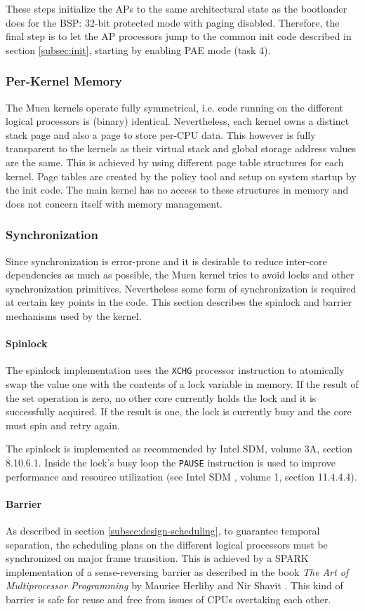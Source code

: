 These steps initialize the APs to the same architectural state as the
bootloader does for the BSP: 32-bit protected mode with paging disabled.
Therefore, the final step is to let the AP processors jump to the common init
code described in section \ref{subsec:init}, starting by enabling PAE mode
(task 4).

\subsubsection{Per-Kernel Memory}
The Muen kernels operate fully symmetrical, i.e. code running on the different
logical processors is (binary) identical. Nevertheless, each kernel owns a
distinct stack page and also a page to store per-CPU data. This however is fully
transparent to the kernels as their virtual stack and global storage address
values are the same. This is achieved by using different page table structures
for each kernel. Page tables are created by the policy tool and setup on system
startup by the init code. The main kernel has no access to these structures in
memory and does not concern itself with memory management.

\subsubsection{Synchronization}
Since synchronization is error-prone and it is desirable to reduce inter-core
dependencies as much as possible, the Muen kernel tries to avoid locks and
other synchronization primitives. Nevertheless some form of synchronization is
required at certain key points in the code. This section describes the spinlock
and barrier mechanisms used by the kernel.

\paragraph{Spinlock}
The spinlock implementation uses the \texttt{XCHG} processor instruction to
atomically swap the value one with the contents of a lock variable in memory.
If the result of the set operation is zero, no other core currently holds the
lock and it is successfully acquired. If the result is one, the lock is
currently busy and the core must spin and retry again.

The spinlock is implemented as recommended by Intel SDM, volume 3A, section
8.10.6.1. Inside the lock's busy loop the \texttt{PAUSE} instruction is used to
improve performance and resource utilization (see Intel SDM \cite{IntelSDM},
volume 1, section 11.4.4.4).

\paragraph{Barrier}
As described in section \ref{subsec:design-scheduling}, to guarantee temporal
separation, the scheduling plans on the different logical processors must be
synchronized on major frame transition. This is achieved by a SPARK
implementation of a sense-reversing barrier as described in the book \emph{The
Art of Multiprocessor Programming} by Maurice Herlihy and Nir Shavit
\cite{Herlihy:2008:AMP:1734069}. This kind of barrier is safe for reuse and free
from issues of CPUs overtaking each other.

